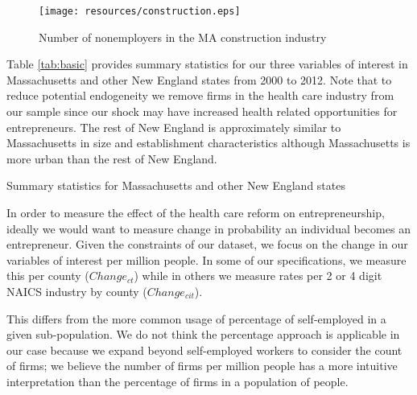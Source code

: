 \documentclass[12pt]{article}
\begin{document}
\begin{figure}[H]
	\centering
	\texttt{[image: resources/construction.eps]}
	\caption{Number of nonemployers in the MA construction industry}
	\label{fig:construct}
\end{figure}

Table \ref{tab:basic} provides summary statistics for our three variables of interest in Massachusetts and other New England states from 2000 to 2012. Note that to reduce potential endogeneity we remove firms in the health care industry from our sample since our shock may have increased health related opportunities for entrepreneurs. The rest of New England is approximately similar to Massachusetts in size and establishment characteristics although Massachusetts is more urban than the rest of New England. 

\begin{table}[H]
	\centering
	\caption{Summary statistics for Massachusetts and other New England states}
	
	\label{tab:basic}
\end{table}

In order to measure the effect of the health care reform on entrepreneurship, ideally we would want to measure change in probability an individual becomes an entrepreneur. Given the constraints of our dataset, we focus on the change in our variables of interest per million people. In some of our specifications, we measure this per county ($Change_{ct}$) while in others we measure rates per 2 or 4 digit NAICS industry by county ($Change_{cit}$). 

This differs from the more common usage of percentage of self-employed in a given sub-population. We do not think the percentage approach is applicable in our case because we expand beyond self-employed workers to consider the count of firms; we believe the number of firms per million people has a more intuitive interpretation than the percentage of firms in a population of people.
\end{document}
